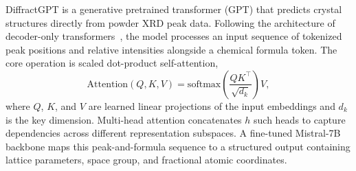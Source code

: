 \documentclass[pdflatex,sn-mathphys-num]{sn-jnl}
\theoremstyle{thmstyleone}
\theoremstyle{thmstyletwo}
\theoremstyle{thmstylethree}
\begin{document}
  DiffractGPT is a generative pretrained transformer (GPT) that predicts crystal                                                                                                  
  structures directly from powder XRD peak data. Following the architecture of                                                                                                    
  decoder-only transformers~\cite{vaswani2017attention}, the model processes an                                                                                                   
  input sequence of tokenized peak positions and relative intensities alongside a                                                                                                 
  chemical formula token. The core operation is scaled dot-product self-attention,                                                                                                
  \begin{equation}                                                                                                                                                                
    \mathrm{Attention}(Q,K,V) =                                                                                                                                                   
      \mathrm{softmax}\!\left(\frac{QK^{\!\top}}{\sqrt{d_k}}\right)V,                                                                                                             
  \end{equation}                                                                                                                                                                  
  where $Q$, $K$, and $V$ are learned linear projections of the input embeddings                                                                                                  
  and $d_k$ is the key dimension. Multi-head attention concatenates $h$ such heads                                                                                                
  to capture dependencies across different representation subspaces. A fine-tuned                                                                                                 
  Mistral-7B~\cite{diffractgpt2025} backbone maps this peak-and-formula sequence                                                                                                  
  to a structured output containing lattice parameters, space group, and fractional                                                                                               
  atomic coordinates.                                                                                                                                                             
                                                                                                                                                                                  
\end{document}
